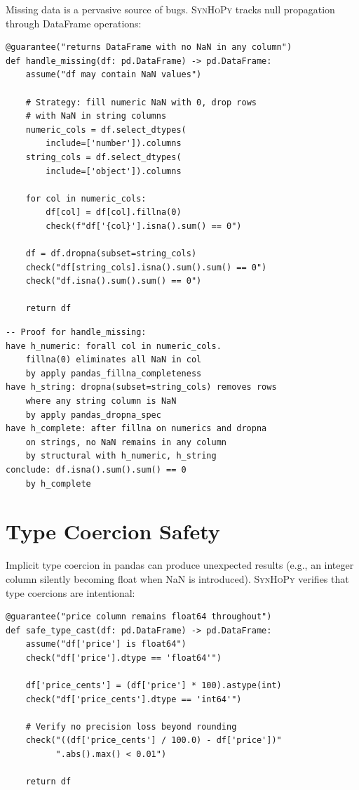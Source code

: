 \documentclass[11pt,a4paper]{report}
\theoremstyle{definition}
\theoremstyle{plain}
\newcommand{\synhopy}{\textsc{SynHoPy}}
\begin{document}
Missing data is a pervasive source of bugs.  \synhopy{} tracks null
propagation through DataFrame operations:

\begin{lstlisting}[style=synhopy]
@guarantee("returns DataFrame with no NaN in any column")
def handle_missing(df: pd.DataFrame) -> pd.DataFrame:
    assume("df may contain NaN values")

    # Strategy: fill numeric NaN with 0, drop rows
    # with NaN in string columns
    numeric_cols = df.select_dtypes(
        include=['number']).columns
    string_cols = df.select_dtypes(
        include=['object']).columns

    for col in numeric_cols:
        df[col] = df[col].fillna(0)
        check(f"df['{col}'].isna().sum() == 0")

    df = df.dropna(subset=string_cols)
    check("df[string_cols].isna().sum().sum() == 0")
    check("df.isna().sum().sum() == 0")

    return df
\end{lstlisting}

\begin{lstlisting}[style=proof]
-- Proof for handle_missing:
have h_numeric: forall col in numeric_cols.
    fillna(0) eliminates all NaN in col
    by apply pandas_fillna_completeness
have h_string: dropna(subset=string_cols) removes rows
    where any string column is NaN
    by apply pandas_dropna_spec
have h_complete: after fillna on numerics and dropna
    on strings, no NaN remains in any column
    by structural with h_numeric, h_string
conclude: df.isna().sum().sum() == 0
    by h_complete
\end{lstlisting}

\section{Type Coercion Safety}

Implicit type coercion in pandas can produce unexpected results (e.g.,
an integer column silently becoming float when NaN is introduced).
\synhopy{} verifies that type coercions are intentional:

\begin{lstlisting}[style=synhopy]
@guarantee("price column remains float64 throughout")
def safe_type_cast(df: pd.DataFrame) -> pd.DataFrame:
    assume("df['price'] is float64")
    check("df['price'].dtype == 'float64'")

    df['price_cents'] = (df['price'] * 100).astype(int)
    check("df['price_cents'].dtype == 'int64'")

    # Verify no precision loss beyond rounding
    check("((df['price_cents'] / 100.0) - df['price'])"
          ".abs().max() < 0.01")

    return df
\end{lstlisting}
\end{document}
